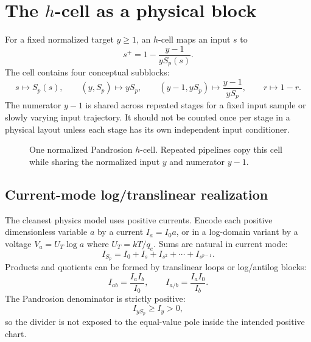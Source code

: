 \documentclass[11pt]{article}
\newcommand{\Sp}{S_p}
\begin{document}
\section{The \(h\)-cell as a physical block}

For a fixed normalized target \(y\ge1\), an \(h\)-cell maps an input \(s\) to
\[
        s^+=1-\frac{y-1}{y\Sp(s)}.
\]
The cell contains four conceptual subblocks:
\[
        s\mapsto \Sp(s),\qquad
        (y,\Sp)\mapsto y\Sp,\qquad
        (y-1,y\Sp)\mapsto \frac{y-1}{y\Sp},\qquad
        r\mapsto1-r.
\]
The numerator \(y-1\) is shared across repeated stages for a fixed input
sample or slowly varying input trajectory.  It should not be counted once per
stage in a physical layout unless each stage has its own independent input
conditioner.

\begin{figure}[htbp]
\centering
{}
\caption{One normalized Pandrosion \(h\)-cell.  Repeated pipelines copy this
cell while sharing the normalized input \(y\) and numerator \(y-1\).}
\label{fig:hcell}
\end{figure}

\subsection{Current-mode log/translinear realization}

The cleanest physics model uses positive currents.  Encode each positive
dimensionless variable \(a\) by a current \(I_a=I_0a\), or in a log-domain
variant by a voltage \(V_a=U_T\log a\) where \(U_T=kT/q_e\).  Sums are natural
in current mode:
\[
        I_{\Sp}=I_0+I_s+I_{s^2}+\cdots+I_{s^{p-1}}.
\]
Products and quotients can be formed by translinear loops or log/antilog
blocks:
\[
        I_{ab}=\frac{I_aI_b}{I_0},
        \qquad
        I_{a/b}=\frac{I_aI_0}{I_b}.
\]
The Pandrosion denominator is strictly positive:
\[
        I_{y\Sp}\ge I_y>0,
\]
so the divider is not exposed to the equal-value pole inside the intended
positive chart.
\end{document}
